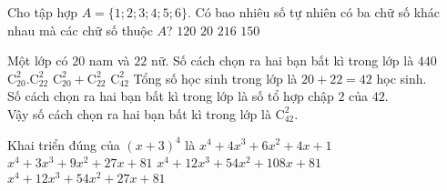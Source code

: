 \begin{ex}%
	Cho tập hợp $A=\{1 ; 2 ; 3 ; 4 ; 5 ; 6\}$. Có bao nhiêu số tự nhiên có ba chữ số khác nhau mà các chữ số thuộc $A$?
	\choice
	{\True $120$}
	{$20$}
	{$216$}
	{$150$}
\end{ex}

\begin{ex}%
Một lớp có $20$ nam và $22$ nữ. Số cách chọn ra hai bạn bất kì trong lớp là
\choice
{$440$}
{$\mathrm{C}^2_{20}.\mathrm{C}^2_{22}$}
{$\mathrm{C}^2_{20}+\mathrm{C}^2_{22}$}
{\True $\mathrm{C}^2_{42}$}
\loigiai
{
	Tổng số học sinh trong lớp là $20+22=42$ học sinh. \\
	Số cách chọn ra hai bạn bất kì trong lớp là số tổ hợp chập $2$ của $42$. \\
	Vậy số cách chọn ra hai bạn bất kì trong lớp là $\mathrm{C}^2_{42}$.
}	
\end{ex}
	
\begin{ex}
	Khai triển đúng của $\left( x+3 \right)^4$ là
	\choice
	{$x^4+4x^3+6x^2+4x+1$}
	{$x^4+3x^3+9x^2+27x+81$}
	{\True $x^4+12x^3+54x^2+108x+81$}
	{$x^4+12x^3+54x^2+27x+81$}
\end{ex}

